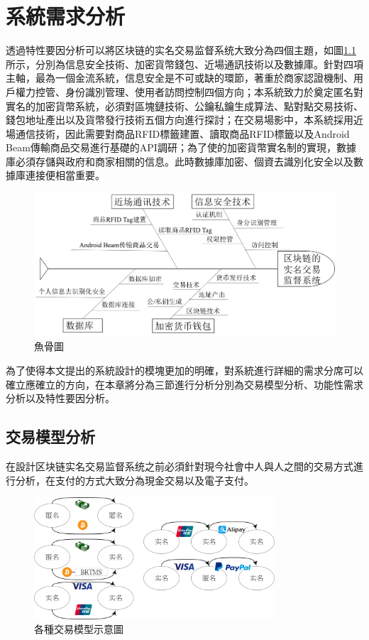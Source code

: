 \chapter{系統需求分析}

透過特性要因分析可以將区块链的实名交易监督系统大致分為四個主題，如圖\ref{fish1}所示，分別為信息安全技術、加密貨幣錢包、近場通訊技術以及數據庫。針對四項主軸，最為一個金流系統，信息安全是不可或缺的環節，著重於商家認證機制、用戶權力控管、身份識別管理、使用者訪問控制四個方向；本系統致力於奠定匿名對實名的加密貨幣系統，必須對區塊鏈技術、公鑰私鑰生成算法、點對點交易技術、錢包地址產出以及貨幣發行技術五個方向進行探討；在交易場影中，本系統採用近場通信技術，因此需要對商品RFID標籤建置、讀取商品RFID標籤以及Android Beam傳輸商品交易進行基礎的API調研；為了使的加密貨幣實名制的實現，數據庫必須存儲與政府和商家相關的信息。此時數據庫加密、個資去識別化安全以及數據庫連接便相當重要。
		\begin{figure}[!htbp]
			\centering
			\includegraphics[width = 1\textwidth]{fish1.png}
			\caption{魚骨圖}\label{fish1}
		\end{figure}

為了使得本文提出的系統設計的模塊更加的明確，對系統進行詳細的需求分席可以確立應確立的方向，在本章將分為三節進行分析分別為交易模型分析、功能性需求分析以及特性要因分析。


\section{交易模型分析}

在設計区块链实名交易监督系统之前必須針對現今社會中人與人之間的交易方式進行分析，在支付的方式大致分為現金交易以及電子支付。
\begin{figure}[!htbp]
	\centering
	\includegraphics[width = 0.8\textwidth]{modeall.png}
	\caption{各種交易模型示意圖}\label{modeall}
\end{figure}

